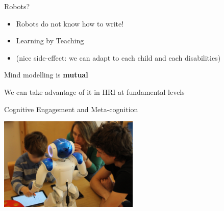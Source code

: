 \documentclass[compress]{beamer}
\begin{document}
\begin{frame}{Robots?}
    \begin{itemize}
        \item<1-> Robots do not know how to write!
        \item<2-> Learning by Teaching
        \item<3-> (nice side-effect: we can adapt to each child and each disabilities)
    \end{itemize}
\end{frame}




\begin{frame}[plain]{}
    \centering
    Mind modelling is {\bf mutual}

    We can take advantage of it in HRI at fundamental levels

\end{frame}


{
\begin{frame}{Cognitive Engagement and Meta-cognition}

    \begin{flushright}
        \includegraphics[width=0.5\textwidth]{cowriter/henry}
    \end{flushright}

\end{frame}
}

\end{document}
